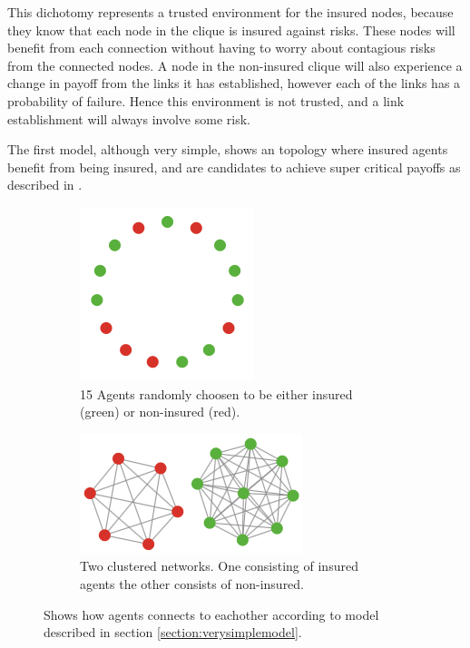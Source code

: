 This dichotomy represents a trusted environment for the insured nodes, because they know that each node in the clique is insured against risks. These nodes will benefit from each connection without having to worry about contagious risks from the connected nodes. 
A node in the non-insured clique will also experience a change in payoff from the links it has established, however each of the links has a probability of failure. Hence this environment is not trusted, and a link establishment will always involve some risk. 

The first model, although very simple, shows an topology where insured agents benefit from being insured, and are candidates to achieve super critical payoffs as described in \cite{contagion}.

\begin{figure}[h]
\centering
\begin{subfigure}{.5\textwidth}
  \centering
  \includegraphics[width=0.4\linewidth]{../Figures/firstModelWithNoParameters1.png}
  \caption{\label{fig:firstmod1} 15 Agents randomly choosen to be either insured (green) or non-insured (red).}
\end{subfigure}
\quad
\begin{subfigure}{.46\textwidth}
  \centering
  \includegraphics[width=0.8\linewidth]{../Figures/firstModelWithNoParameters2.png}
  \caption{\label{fig:firstmod2} Two clustered networks. One consisting of insured agents the other consists of non-insured.}
\end{subfigure}
\caption{\label{fig:firstmodfinal} Shows how agents connects to eachother according to model described in section \ref{section:verysimplemodel}.}
\end{figure}
 
